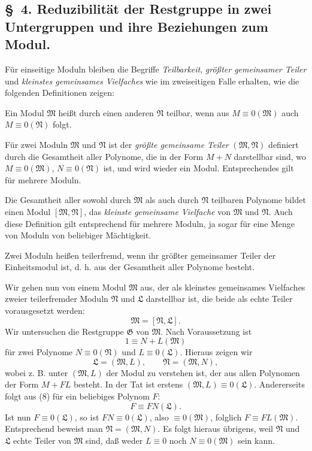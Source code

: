 \documentclass[11pt]{article}
\newcommand{\mM}{\mathfrak{M}}
\newcommand{\mN}{\mathfrak{N}}
\newcommand{\mL}{\mathfrak{L}}
\newcommand{\mG}{\mathfrak{G}}
\begin{document}
\subsection*{\S~4. Reduzibilität der Restgruppe in zwei Untergruppen und ihre Beziehungen zum Modul.}

Für einseitige Moduln bleiben die Begriffe \emph{Teilbarkeit}, \emph{größter gemeinsamer Teiler} und \emph{kleinstes gemeinsames Vielfaches} wie im zweiseitigen Falle erhalten, wie die folgenden Definitionen zeigen:

Ein Modul $\mM$ heißt durch einen anderen $\mN$ teilbar, wenn aus $M\equiv0(\mM)$ auch $M\equiv0(\mN)$ folgt.

Für zwei Moduln $\mM$ und $\mN$ ist der \emph{größte gemeinsame Teiler} $(\mM,\mN)$ definiert durch die Gesamtheit aller Polynome, die in der Form $M+N$ darstellbar sind, wo $M\equiv0(\mM)$, $N\equiv0(\mN)$ ist, und wird wieder ein Modul. Entsprechendes gilt für mehrere Moduln.

Die Gesamtheit aller sowohl durch $\mM$ als auch durch $\mN$ teilbaren Polynome bildet einen Modul $[\mM,\mN]$, das \emph{kleinste gemeinsame Vielfache} von $\mM$ und $\mN$. Auch diese Definition gilt entsprechend für mehrere Moduln, ja sogar für eine Menge von Moduln von beliebiger Mächtigkeit.

Zwei Moduln heißen teilerfremd, wenn ihr größter gemeinsamer Teiler der Einheitsmodul ist, d. h. aus der Gesamtheit aller Polynome besteht.

Wir gehen nun von einem Modul $\mM$ aus, der als kleinstes gemeinsames Vielfaches zweier teilerfremder Moduln $\mN$ und $\mL$ darstellbar ist, die beide als echte Teiler vorausgesetzt werden:
\begin{equation}
 \mM=[\mN,\mL].
\tag{7}
\end{equation}
Wir untersuchen die Restgruppe $\mG$ von $\mM$. Nach Voraussetzung ist
\begin{equation}
 1\equiv N+L(\mM)
\tag{8}
\end{equation}
für zwei Polynome $N\equiv0(\mN)$ und $L\equiv0(\mL)$. Hieraus zeigen wir
\begin{equation}
 \mL=(\mM,L),\qquad \mN=(\mM,N),
\tag{9}
\end{equation}
wobei z. B. unter $(\mM,L)$ der Modul zu verstehen ist, der aus allen Polynomen der Form $M+FL$ besteht. In der Tat ist erstens $(\mM,L)\equiv0(\mL)$. Andererseits folgt aus (8) für ein beliebiges Polynom $F$:
\begin{equation}
 F\equiv FN(\mL).
\tag{10}
\end{equation}
Ist nun $F\equiv0(\mL)$, so ist $FN\equiv0(\mL)$, also $\equiv0(\mM)$, folglich $F\equiv FL(\mM)$. Entsprechend beweist man $\mN=(\mM,N)$. Es folgt hieraus übrigens, weil $\mN$ und $\mL$ echte Teiler von $\mM$ sind, daß weder $L\equiv0$ noch $N\equiv0(\mM)$ sein kann.
\end{document}
